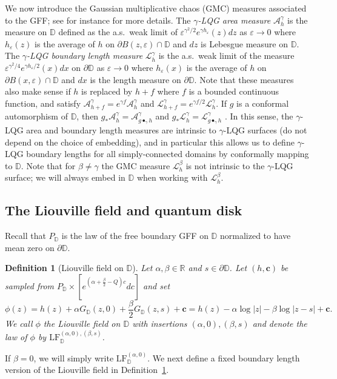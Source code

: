 \documentclass[a4paper]{article}
\numberwithin{equation}{section}
\def\epsilon{\varepsilon}
\newcommand{\bbD}{\mathbb{D}}
\newcommand{\D}{\mathbb{D}}
\newcommand{\bbR}{\mathbb{R}}
\newcommand{\cA}{\mathcal{A}}
\newcommand{\cL}{\mathcal{L}}
\newcommand{\LF}{\mathrm{LF}}
\newtheorem{definition}[theorem]{Definition}
\theoremstyle{remark}
\numberwithin{equation}{section}
\begin{document}
We now introduce the Gaussian multiplicative chaos (GMC) measures \cite{kahane} associated to the GFF; see for instance \cite{shef-kpz, berestycki-gmt-elementary} for more details.
The \emph{$\gamma$-LQG  area measure} $\cA_h^{\gamma}$ is the measure on $\D$ defined as the a.s.\ weak limit of $\epsilon^{\gamma^2/2}e^{\gamma h_{\epsilon}}(z)dz$ as $\epsilon \to 0$ where $h_{\epsilon}(z)$ is the average of $h$ on $\partial B(z, \epsilon) \cap \D$ and $dz$ is Lebesgue measure on $\D$. The \emph{$\gamma$-LQG boundary length measure} $\cL_h^{\gamma}$ is the a.s.\ weak limit of the measure $ \epsilon^{\gamma^2/4}e^{\gamma h_{\epsilon}/2}(x)dx$ on $\partial \D$ as $\epsilon \to 0$ where $h_{\epsilon}(x)$ is the average of $h$ on $\partial B(x, \epsilon) \cap \D$ and $dx$ is the length measure on $\partial \D$. Note that these measures also make sense if $h$ is replaced by $h + f$ where $f$ is a bounded continuous function, and satisfy $\cA^\gamma_{h+f} = e^{\gamma f} \cA^\gamma_h$ and $\cL^\gamma_{h+f} = e^{\gamma f/2} \cL^\gamma_h$. 
If $g$ is a conformal automorphism of $\D$, then $g_* \cA^\gamma_h = \cA^\gamma_{g \bullet_\gamma h}$ and $g_* \cL^\gamma_h = \cL^\gamma_{g \bullet_\gamma h}$ \cite{shef-kpz}. In this sense, the $\gamma$-LQG area and boundary length measures are intrinsic to $\gamma$-LQG surfaces (do not depend on the choice of embedding), and in particular this allows us to define $\gamma$-LQG boundary lengths for all simply-connected domains by conformally mapping to $\D$. Note that for $\beta \neq \gamma$ the GMC measure $\cL^\beta_h$ is not intrinsic to the $\gamma$-LQG surface; we will always embed in $\D$ when working with $\cL^\beta_h$.


\subsection{The Liouville field and quantum disk}\label{subsec-liouville-field}
Recall that $P_\D$ is the law of the free boundary GFF on $\D$ normalized to have mean zero on $\partial \D$. 

\begin{definition}[Liouville field on $\mathbb{D}$]\label{def-lf}
Let $\alpha,\beta\in\bbR$ and $s\in\partial\bbD$. 
Let $(h,\mathbf{c})$ be sampled from $P_\bbD\times [e^{(\alpha+\frac{\beta}{2}-Q)c}dc] $ and set 
\[\phi(z) = h(z)+\alpha G_\bbD(z,0)+\frac{\beta}{2}G_\bbD(z,s)+\mathbf c = h(z) - \alpha \log|z| - \beta \log |z - s| + \mathbf c.\] We call $\phi$ the Liouville field on $\bbD$ with insertions $(\alpha,0),(\beta,s)$ and denote the law of $\phi$ by  $\LF_\bbD^{(\alpha, 0), (\beta, s)}$. 
\end{definition}
If $\beta = 0$, we will simply write $\LF_\D^{(\alpha, 0)}$.
We next define a fixed boundary length version of the Liouville field in Definition~\ref{def-lf}.
\end{document}
